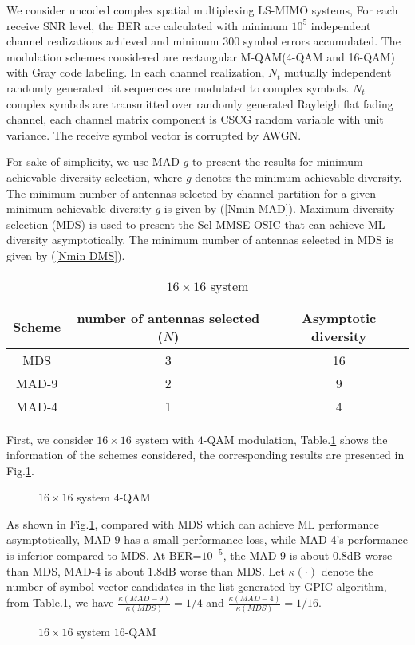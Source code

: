 \documentclass[12pt, draftclsnofoot, onecolumn]{IEEEtran}
\begin{document}
We consider uncoded complex spatial multiplexing LS-MIMO systems, For each receive SNR level, the BER are calculated with minimum $10^{5}$ independent channel realizations achieved and minimum 300 symbol errors accumulated. The modulation schemes considered are rectangular M-QAM(4-QAM and 16-QAM) with Gray code labeling. In each channel realization, $N_{t}$ mutually independent randomly generated bit sequences are modulated to complex symbols. $N_{t}$ complex symbols are transmitted over randomly generated Rayleigh flat fading channel, each channel matrix component is CSCG random variable with unit variance. The receive symbol vector is corrupted by AWGN.

For sake of simplicity, we use MAD-$g$ to present the results for minimum achievable diversity selection, where $g$ denotes the minimum achievable diversity. The minimum number of antennas selected by channel partition for a given minimum achievable diversity $g$ is given by (\ref{Nmin MAD}). Maximum diversity selection (MDS) is used to present the Sel-MMSE-OSIC that can achieve ML diversity asymptotically. The minimum number of antennas selected in MDS is given by (\ref{Nmin DMS}).
\begin{table}[htb]
\renewcommand{\arraystretch}{1.3}
\caption{$16\times 16$ system}
\label{t16MIMO4QAM}
\centering
\begin{tabular}{|c|c|c|}
\hline
Scheme&number of antennas selected ($N$)&Asymptotic diversity\\
\hline 
MDS&3&16\\
\hline
MAD-9&2&9\\
\hline
MAD-4&1&4\\
\hline
\end{tabular}
\end{table}

First, we consider $16\times 16$ system with $4$-QAM modulation, Table.\ref{t16MIMO4QAM} shows the information of the schemes considered, the corresponding results are presented in Fig.\ref{f16MIMO4QAM}. 
\begin{figure}[htb]
\centering
\def\svgwidth{\columnwidth}

\caption{$16\times 16$ system $4$-QAM}
\label{f16MIMO4QAM}
\end{figure}

As shown in Fig.\ref{f16MIMO4QAM}, compared with MDS which can achieve ML performance asymptotically, MAD-9 has a small performance loss, while MAD-4's performance is inferior compared to MDS. At BER=$10^{-5}$, the MAD-9 is about $0.8$dB worse than MDS, MAD-4 is about $1.8$dB worse than MDS. Let $\kappa(\cdot)$ denote the number of symbol vector candidates in the list generated by GPIC algorithm\cite{radji2009interference}, from Table.\ref{t16MIMO4QAM}, we have $\frac{\kappa(MAD-9)}{\kappa(MDS)}=1/4$ and $\frac{\kappa(MAD-4)}{\kappa(MDS)}=1/16$.\newpage
\begin{figure}[htb]
\centering
\def\svgwidth{\columnwidth}

\caption{$16\times 16$ system $16$-QAM}
\label{f16MIMO16QAM}
\end{figure}
\end{document}

